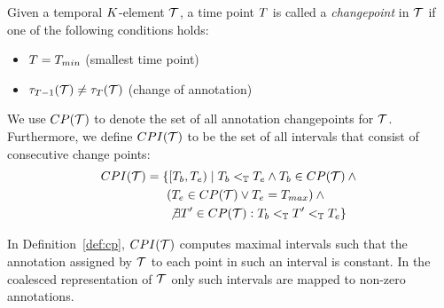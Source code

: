 \begin{defi}\label{def:cp}
  Given a temporal $K$-element $\mathcal{T}$, a time point $T$ is called a \emph{changepoint} in $\mathcal{T}$ if one of the following conditions holds:
  \begin{itemize}
  \item  $T = T_{min}$ %
    \hfill(smallest  time point)
  \item $\tau_{T - 1}(\mathcal{T}) \neq \tau_{T}(\mathcal{T})$ \hfill(change of annotation)
  \end{itemize}
  We use $CP(\mathcal{T})$ to denote the set of all annotation
  changepoints for $\mathcal{T}$. Furthermore, we define $CPI(\mathcal{T})$ to
  be the set of all intervals that consist of consecutive change
  points:
  \begin{align*}
    CPI(\mathcal{T}) &= \{ [T_b, T_e) \mid T_b <_{\mathbb{T}} T_e \wedge T_b \in CP(\mathcal{T}) \wedge{}
    \\
                  &\thickspace\thickspace\thickspace\thickspace\thickspace\thickspace(T_e \in CP(\mathcal{T}) \vee T_e = T_{max}) \wedge{}
    \\
                  &\thickspace\thickspace\thickspace\thickspace\thickspace\thickspace \not\exists T' \in CP(\mathcal{T}): T_b <_{\mathbb{T}} T' <_{\mathbb{T}} T_e \}
  \end{align*}
\end{defi}

In Definition~\ref{def:cp}, $CPI(\mathcal{T})$ computes maximal intervals
such that the annotation assigned by $\mathcal{T}$ to each point in such an
interval is constant. In the coalesced representation of
$\mathcal{T}$ only such intervals are mapped to non-zero annotations. %


